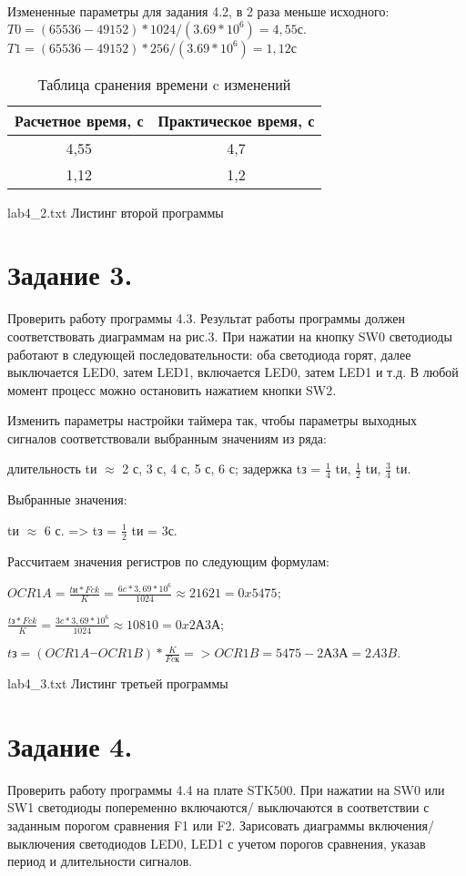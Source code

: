 \documentclass{bmstu}
\begin{document}
Измененные параметры для задания 4.2, в 2 раза меньше исходного: \\ 
$T0 = (65536 - 49152) * 1024 / (3.69 * 10^6) = 4,55с. $ \\
$T1 = (65536 - 49152) * 256 / (3.69 * 10^6) = 1,12с$


\begin{table}[H]
\caption{Таблица сранения времени c изменений}
\label{table:eq_table_2}
\begin{tabular}{| c | c |}
	\hline
		Расчетное время, с & Практическое время, с \\
	\hline	
		4,55 & 4,7 \\
	\hline
		1,12 & 1,2 \\
	\hline
\end{tabular}
\end{table}

	{lab4_2.txt}
	{Листинг второй программы}

\chapter{Задание 3.}

Проверить работу программы 4.3. Результат работы программы должен соответствовать диаграммам на рис.3. При нажатии 
на кнопку SW0 светодиоды работают в следующей последовательности: оба светодиода горят, далее выключается LED0, 
затем LED1, включается LED0, затем LED1 и т.д. В любой момент процесс можно остановить нажатием кнопки SW2. 

Изменить параметры настройки таймера так, чтобы параметры выходных сигналов соответствовали выбранным значениям из 
ряда: 

длительность tи $\approx$ 2 с, 3 с, 4 с, 5 с, 6 с; 
задержка tз = $ \frac{1}{4} $ tи, 
$\frac{1}{2}$ tи, $\frac{3}{4}$ tи.

Выбранные значения: 

tи $\approx$ 6 с. => tз = $\frac{1}{2}$ tи = 3с. 

Рассчитаем значения регистров по следующим формулам: 

$OCR1A=\frac{tи*Fck}{K}=\frac{6c * 3,69 * 10^6}{1024} \approx 21621= 0x5475;$ 

$\frac{tз*Fck}{K} = \frac{3c * 3,69 * 10^6}{1024} \approx 10810= 0x2А3А; $

$tз= (OCR1A ‒ OCR1B) * \frac{K}{Fcк} => OCR1B = 5475-2А3А=2A3B. $

	{lab4_3.txt}
	{Листинг третьей программы}

\chapter{Задание 4.}
Проверить работу программы 4.4 на плате STK500. При нажатии на SW0 или SW1 светодиоды попеременно включаются/
выключаются в соответствии с заданным порогом сравнения F1 или F2. Зарисовать диаграммы включения/выключения 
светодиодов LED0, LED1 с учетом порогов сравнения, указав период и длительности сигналов. 
\end{document}
